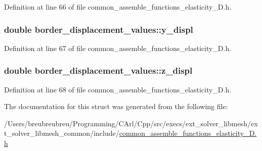 Definition at line 66 of file common\+\_\+assemble\+\_\+functions\+\_\+elasticity\+\_\+D.\+h.

\hypertarget{structborder__displacement__values_add771bac55cf12535ad4329d92c81d92}{}
\subsubsection[{y\+\_\+displ}]{\setlength{\rightskip}{0pt plus 5cm}double border\+\_\+displacement\+\_\+values\+::y\+\_\+displ}\label{structborder__displacement__values_add771bac55cf12535ad4329d92c81d92}


Definition at line 67 of file common\+\_\+assemble\+\_\+functions\+\_\+elasticity\+\_\+D.\+h.

\hypertarget{structborder__displacement__values_a2c7c653e236a44f295db2d74ced8706b}{}
\subsubsection[{z\+\_\+displ}]{\setlength{\rightskip}{0pt plus 5cm}double border\+\_\+displacement\+\_\+values\+::z\+\_\+displ}\label{structborder__displacement__values_a2c7c653e236a44f295db2d74ced8706b}


Definition at line 68 of file common\+\_\+assemble\+\_\+functions\+\_\+elasticity\+\_\+D.\+h.



The documentation for this struct was generated from the following file\+:\begin{DoxyCompactItemize}
\item 
/\+Users/breubreubreu/\+Programming/\+C\+Arl/\+Cpp/src/execs/ext\+\_\+solver\+\_\+libmesh/ext\+\_\+solver\+\_\+libmesh\+\_\+common/include/\hyperlink{common__assemble__functions__elasticity__3_d_8h}{common\+\_\+assemble\+\_\+functions\+\_\+elasticity\+\_\+D.\+h}\end{DoxyCompactItemize}
